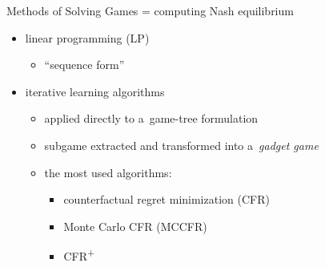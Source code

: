 \documentclass{beamer}
\theoremstyle{definition}
\newcommand{\cfrplus}{CFR\textsuperscript{+}~}
\begin{document}
  \begin{frame}{Methods of Solving Games}
    = computing Nash equilibrium
    \pause

    \begin{itemize}[<+- | alert@+>]
      \item linear programming (LP)
        \begin{itemize}
          \item ``sequence form''
        \end{itemize}
      \item iterative learning algorithms 
        \begin{itemize}
          \item applied directly to a~game-tree formulation
          \item subgame extracted and transformed into a~\emph{gadget game}
          \item the most used algorithms:
            \begin{itemize}
              \item counterfactual regret minimization (CFR)
              \item Monte Carlo CFR (MCCFR)
              \item \cfrplus
            \end{itemize}
        \end{itemize}
    \end{itemize}
  \end{frame}
\end{document}
